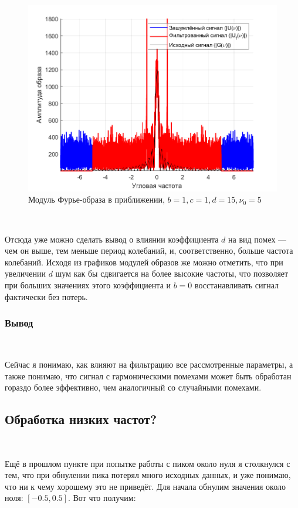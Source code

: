 \documentclass[a4paper]{article}
\begin{document}
\begin{figure}[H]
    \centering
    \includegraphics[width=0.5\linewidth]{part2/1_1_5_Fourier_scaled.png}
    \caption{Модуль Фурье-образа в приближении, $b = 1, c = 1, d = 15, \nu_0 = 5$}
\end{figure}\

Отсюда уже можно сделать вывод о влиянии коэффициента $d$ на вид помех --- чем он выше, тем меньше период колебаний, и, соответственно, больше частота колебаний. Исходя из графиков модулей образов же можно отметить, что при увеличении $d$ шум как бы сдвигается на более высокие частоты, что позволяет при больших значениях этого коэффициента и $b = 0$ восстанавливать сигнал фактически без потерь.

\subsubsection{Вывод}\

Сейчас я понимаю, как влияют на фильтрацию все рассмотренные параметры, а также понимаю, что сигнал с гармоническими помехами может быть обработан гораздо более эффективно, чем аналогичный со случайными помехами.

\subsection{Обработка низких частот?}\

Ещё в прошлом пункте при попытке работы с пиком около нуля я столкнулся с тем, что при обнулении пика потерял много исходных данных, и уже понимаю, что ни к чему хорошему это не приведёт. Для начала обнулим значения около ноля: $[-0.5, 0.5]$. Вот что получим:
\end{document}
